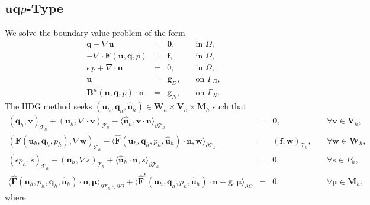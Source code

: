 \documentclass[11pt]{article}
\begin{document}
\subsection{$\bm{uq}p$-Type}

We solve the boundary value problem of the form
\begin{equation}
\begin{array}{rcll}
\bm{q} - \nabla \bm{u}  & = & \bm{0} , & \quad \mbox{in } \Omega, \\
- \nabla \cdot \bm{F} (\bm{u},\bm{q},p) & = & \bm{f}, & \quad \mbox{in } \Omega, \\
\epsilon \, p + \nabla \cdot \bm{u}  & = & 0 , & \quad \mbox{in } \Omega, \\
\bm{u} & = & \bm{g}_D, & \quad \mbox{on } \Gamma_D , \\
\bm{B}^n(\bm{u},\bm{q},p) \cdot \bm{n} & = & \bm{g}_N, & \quad \mbox{on } \Gamma_N .
\end{array}
\end{equation}
The HDG method seeks $(\bm{u}_h,\bm{q}_h,\widehat{\bm{u}}_h) \in \bm{W}_h \times \bm{V}_h \times \bm{M}_h$ such that
\begin{equation}
\begin{array}{rcll}
(\bm{q}_h, \bm{v})_{\mathcal{T}_h} + (\bm{u}_h, \nabla \cdot \bm{v})_{\mathcal{T}_h} - \langle \widehat{\bm{u}}_h, \bm{v} \cdot \bm{n} \rangle_{\partial \mathcal{T}_h}  & = & \bm{0}, & \quad \forall \bm{v} \in \bm{V}_h, \\[2ex] 
(\bm{F} (\bm{u}_h,\bm{q}_h,p_h), \nabla \bm{w})_{\mathcal{T}_h} - \langle \widehat{\bm{F}} (\bm{u}_h, \bm{q}_h,p_h,\widehat{\bm{u}}_h) \cdot \bm{n}, \bm{w} \rangle_{\partial \mathcal{T}_h} & = & (\bm{f}, \bm{w})_{\mathcal{T}_h}, & \quad \forall \bm{w} \in \bm{W}_h, \\[2ex]
(\epsilon p_h, s)_{\mathcal{T}_h} - (\bm{u}_h, \nabla s)_{\mathcal{T}_h} + \langle \widehat{\bm{u}}_h \cdot \bm{n},s \rangle_{\partial \mathcal{T}_h}  & = & 0, & \quad \forall s \in P_h, \\[2ex] 
\langle \widehat{\bm{F}} (\bm{u}_h,p_h,\bm{q}_h, \widehat{\bm{u}}_h) \cdot \bm{n}, \bm{\mu} \rangle_{\partial \mathcal{T}_h \backslash \partial \Omega} + \langle \widehat{\bm{F}}^b(\bm{u}_h, \bm{q}_h, p_h,\widehat{\bm{u}}_h) \cdot \bm{n} - \bm{g}, \bm{\mu} \rangle_{\partial \Omega}  & = & 0, & \quad \forall \bm{\mu} \in \bm{M}_h ,
\end{array}
\end{equation}
where
\end{document}
